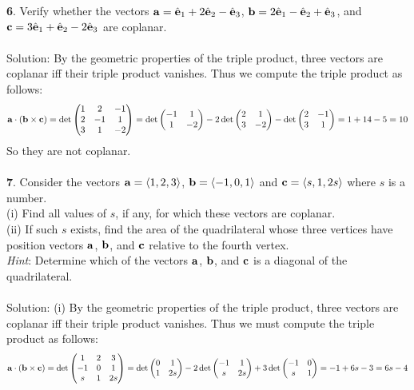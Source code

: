 \documentclass[12pt]{amsbook}
\newcommand{\la}{\langle}
\newcommand{\ra}{\rangle}
\begin{document}
{\small\bf 6}. Verify whether the vectors ${\bf a}=\hat{\bf e}_1
+2\hat{\bf e}_2-\hat{\bf e}_3$, ${\bf b}=2\hat{\bf e}_1 -\hat{\bf
e}_2+\hat{\bf e}_3$, and ${\bf c}=3\hat{\bf e}_1 +\hat{\bf
e}_2-2\hat{\bf e}_3$ are coplanar.\\
\\
{\sc Solution}: By the geometric properties of the triple product, three vectors are coplanar iff their triple product vanishes. Thus we compute the triple product as follows:
$${\bf a}\cdot({\bf b}\times{\bf c})=\det
\begin{pmatrix}
1 & 2 & -1\cr 2&-1&1\cr 3&1&-2 \end{pmatrix}=\det\begin{pmatrix}-1&1\cr 1&-2  \end{pmatrix}-2\det\begin{pmatrix}2&1\cr 3&-2  \end{pmatrix}-\det\begin{pmatrix}2&-1\cr 3&1 \end{pmatrix}=1+14-5=10$$
So they are not coplanar.
\\
\\
{\small\bf 7}.  Consider
the vectors ${\bf a}=\la 1,2,3\ra$, 
${\bf b}=\la -1,0,1\ra$ and ${\bf c}=\la s,1,2s\ra$ where $s$ is a number.\\
(i) Find all values of $s$, if any, for which these vectors
are coplanar.\\
(ii) If such $s$ exists, find the area of the quadrilateral whose three vertices
have position vectors ${\bf a}$, ${\bf b}$, and ${\bf c}$ relative
to the fourth vertex. \\
{\it Hint}: Determine which of the vectors ${\bf a}$, ${\bf b}$, and 
${\bf c}$ is a diagonal of the quadrilateral.\\
\\
{\sc Solution}: (i) By the geometric properties of the triple product, three vectors are coplanar iff their triple product vanishes. Thus we must compute the triple product as follows: 
$${\bf a}\cdot({\bf b}\times{\bf c})=\det
\begin{pmatrix}
1 & 2 & 3\cr -1&0&1\cr s&1&2s \end{pmatrix}=\det\begin{pmatrix}0&1\cr 1&2s  \end{pmatrix}-2\det\begin{pmatrix}-1&1\cr s&2s  \end{pmatrix}+3\det\begin{pmatrix}-1&0\cr s&1 \end{pmatrix}=-1+6s-3=6s-4$$
\end{document}
